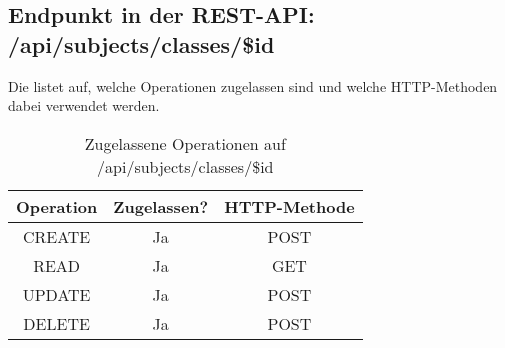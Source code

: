 \subsection{Endpunkt in der REST-API: /api/subjects/classes/\$id}
Die  listet auf, welche Operationen zugelassen sind und welche HTTP-Methoden dabei verwendet werden. 

\begin{table}[!htbp]
	\begin{tabular}{|c|c|c|}
		\hline
			\textbf{Operation} & \textbf{Zugelassen?} & \textbf{HTTP-Methode} \\ \hline
			CREATE & Ja & POST \\ \hline 
			READ & Ja & GET \\ \hline
			UPDATE & Ja & POST \\ \hline 
			DELETE & Ja & POST \\ \hline
	\end{tabular}

		\caption{Zugelassene Operationen auf /api/subjects/classes/\$id}
		\label{tab:end:rest:api:subjects:classes:id:meth}
\end{table}

